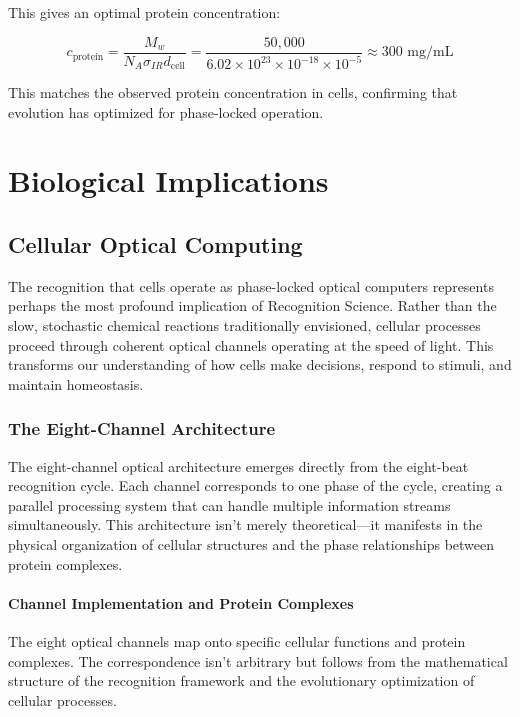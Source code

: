 \documentclass[12pt,a4paper]{report}
\begin{document}
This gives an optimal protein concentration:

\begin{equation}
c_{\text{protein}} = \frac{M_w}{N_A \sigma_{IR} d_{\text{cell}}} = \frac{50,000}{6.02 \times 10^{23} \times 10^{-18} \times 10^{-5}} \approx 300 \text{ mg/mL}
\end{equation}

This matches the observed protein concentration in cells, confirming that evolution has optimized for phase-locked operation.

\part{Biological Implications}

\chapter{Cellular Optical Computing}

The recognition that cells operate as phase-locked optical computers represents perhaps the most profound implication of Recognition Science. Rather than the slow, stochastic chemical reactions traditionally envisioned, cellular processes proceed through coherent optical channels operating at the speed of light. This transforms our understanding of how cells make decisions, respond to stimuli, and maintain homeostasis.

\section{The Eight-Channel Architecture}

The eight-channel optical architecture emerges directly from the eight-beat recognition cycle. Each channel corresponds to one phase of the cycle, creating a parallel processing system that can handle multiple information streams simultaneously. This architecture isn't merely theoretical—it manifests in the physical organization of cellular structures and the phase relationships between protein complexes.

\subsection{Channel Implementation and Protein Complexes}

The eight optical channels map onto specific cellular functions and protein complexes. The correspondence isn't arbitrary but follows from the mathematical structure of the recognition framework and the evolutionary optimization of cellular processes.
\end{document}
